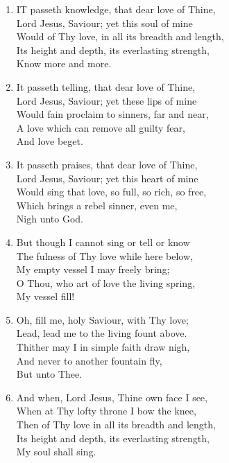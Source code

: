 \documentclass[11pt,a4paper]{article}
\begin{document}
\begin{enumerate}
    \item IT passeth knowledge, that dear love of Thine, \\
        Lord Jesus, Saviour; yet this soul of mine \\
        Would of Thy love, in all its breadth and length, \\
        Its height and depth, its everlasting strength, \\
            Know more and more.

    \item It passeth telling, that dear love of Thine, \\
        Lord Jesus, Saviour; yet these lips of mine \\
        Would fain proclaim to sinners, far and near, \\
        A love which can remove all guilty fear, \\
            And love beget.

    \item It passeth praises, that dear love of Thine, \\
        Lord Jesus, Saviour; yet this heart of mine \\
        Would sing that love, so full, so rich, so free, \\
        Which brings a rebel sinner, even me, \\
            Nigh unto God.

    \item But though I cannot sing or tell or know \\
        The fulness of Thy love while here below, \\
        My empty vessel I may freely bring; \\
        O Thou, who art of love the living spring, \\
            My vessel fill!

    \item Oh, fill me, holy Saviour, with Thy love; \\
        Lead, lead me to the living fount above. \\
        Thither may I in simple faith draw nigh, \\
        And never to another fountain fly, \\
            But unto Thee.

    \item And when, Lord Jesus, Thine own face I see, \\
        When at Thy lofty throne I bow the knee, \\
        Then of Thy love in all its breadth and length, \\
        Its height and depth, its everlasting strength, \\
            My soul shall sing.

\end{enumerate}
\end{document}
